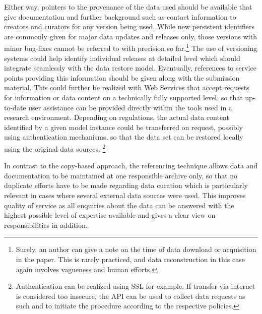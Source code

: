\documentclass{acm_proc_article-sp}
\begin{document}
Either way, pointers to the provenance of the data used should be available that give documentation and further background such as contact information to creators and curators for any version being used.
While new persistent identifiers are commonly given for major data updates and releases only, those versions with minor bug-fixes cannot be referred to with precision so far.\footnote{Surely, an author can give a note on the time of data download or acquisition in the paper. This is rarely practiced, and data reconstruction in this case again involves vagueness and human efforts.}
The use of versioning systems could help identify individual releases at detailed level \cite{KoenkerZeileis2009} which should integrate seamlessly with the data restore model.
Eventually, references to service points providing this information should be given along with the submission material.
This could further be realized with Web Services that accept requests for information or data content on a technically fully supported level, so that up-to-date user assistance can be provided directly within the tools used in a research environment.
Depending on regulations, the actual data content identified by a given model instance could be transferred on request, possibly using authentication mechanisms, so that the data set can be restored locally using the original data sources.
\footnote{Authentication can be realized using SSL for example. If transfer via internet is considered too insecure, the API can be used to collect data requests as such and to initiate the procedure according to the respective policies.}


In contrast to the copy-based approach, the referencing technique allows data and documentation to be maintained at one responsible archive only, so that no duplicate efforts have to be made regarding data curation which is particularly relevant in cases where several external data sources were used.
This improves quality of service as all enquiries about the data can be answered with the highest possible level of expertise available and gives a clear view on responsibilities in addition.
\end{document}

